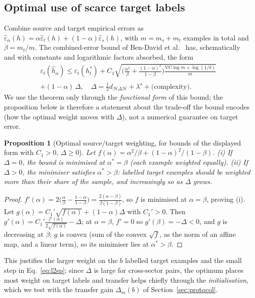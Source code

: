 \documentclass[journal]{IEEEtran}
\newtheorem{proposition}{Proposition}
\newcommand{\1}{\mathbf{1}}
\newcommand{\Hspace}{\mathcal{H}}
\begin{document}
\subsection{Optimal use of scarce target labels}
Combine source and target empirical errors as $\hat\varepsilon_\alpha(h)=\alpha\hat\varepsilon_t(h)+(1-\alpha)\hat\varepsilon_s(h)$, with $m=m_s+m_t$ examples in total and $\beta=m_t/m$. The combined-error bound of Ben-David et al.\ \cite{bendavid2010theory} has, schematically and with constants and logarithmic factors absorbed, the form
\begin{multline}
\varepsilon_t(\hat h_\alpha)\le\varepsilon_t(h_t^\ast)+C_1\sqrt{\Big(\tfrac{\alpha^2}{\beta}+\tfrac{(1-\alpha)^2}{1-\beta}\Big)\tfrac{\mathrm{VC}\log m+\log(1/\delta)}{m}}\\
+(1-\alpha)\,\Delta,\quad \Delta=\tfrac12\hat d_{\Hspace\Delta\Hspace}+\lambda^\star+\text{(complexity)}.
\end{multline}
\noindent We use the theorem only through the \emph{functional form} of this bound; the proposition below is therefore a statement about the trade-off the bound encodes (how the optimal weight moves with $\Delta$), not a numerical guarantee on target error.
\begin{proposition}[Optimal source/target weighting, for bounds of the displayed form with $C_1>0$, $\Delta\ge0$]\label{prop:mix}
Let $f(\alpha)=\alpha^2/\beta+(1-\alpha)^2/(1-\beta)$. (i) If $\Delta=0$, the bound is minimised at $\alpha^\ast=\beta$ (each example weighted equally). (ii) If $\Delta>0$, the minimiser satisfies $\alpha^\ast>\beta$: labelled target examples should be weighted \emph{more} than their share of the sample, and increasingly so as $\Delta$ grows.
\end{proposition}
\begin{proof}
$f'(\alpha)=2\big(\tfrac\alpha\beta-\tfrac{1-\alpha}{1-\beta}\big)=\tfrac{2(\alpha-\beta)}{\beta(1-\beta)}$, so $f$ is minimised at $\alpha=\beta$, proving (i). Let $g(\alpha)=C_1'\sqrt{f(\alpha)}+(1-\alpha)\Delta$ with $C_1'>0$. Then $g'(\alpha)=C_1'\tfrac{f'(\alpha)}{2\sqrt{f(\alpha)}}-\Delta$; at $\alpha=\beta$, $f'=0$ so $g'(\beta)=-\Delta<0$, and $g$ is decreasing at $\beta$; $g$ is convex (sum of the convex $\sqrt{f}$, as the norm of an affine map, and a linear term), so its minimiser lies at $\alpha^\ast>\beta$. \end{proof}
\noindent This justifies the larger weight on the $b$ labelled target examples and the small step in Eq.~\eqref{eq:l2sp}; since $\Delta$ is large for cross-sector pairs, the optimum places most weight on target labels and transfer helps chiefly through the \emph{initialisation}, which we test with the transfer gain $\Delta_m(b)$ of Section~\ref{sec:protocol}.
\end{document}
